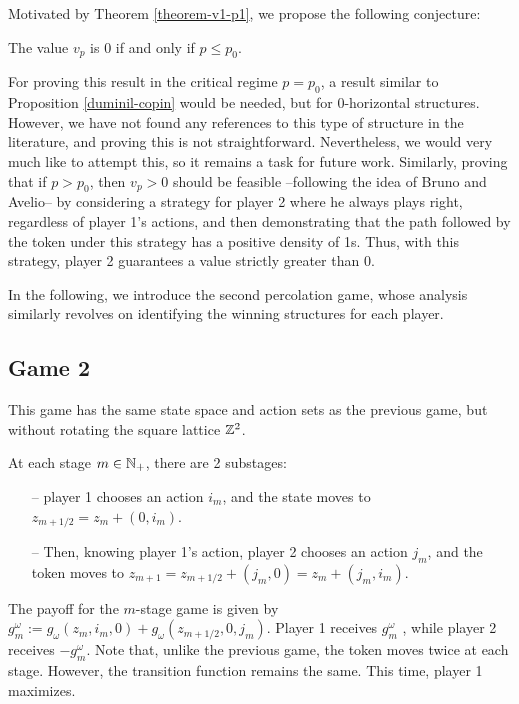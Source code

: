         Motivated by Theorem \ref{theorem-v1-p1}, we propose the following conjecture:

        \begin{conjecture}\label{conjecture-v0-p0}
            The value $v_p$ is 0 if and only if $p \leq p_0$.
        \end{conjecture}

        For proving this result in the critical regime $p = p_0$, a result similar to Proposition \ref{duminil-copin} would be needed, but for 0-horizontal structures. However, we have not found any references to this type of structure in the literature, and proving this is not straightforward. Nevertheless, we would very much like to attempt this, so it remains a task for future work. Similarly, proving that if $p > p_0$, then $v_p > 0$ should be feasible --following the idea of Bruno and Avelio-- by considering a strategy for player 2 where he always plays right, regardless of player 1's actions, and then demonstrating that the path followed by the token under this strategy has a positive density of 1s. Thus, with this strategy, player 2 guarantees a value strictly greater than 0.

        In the following, we introduce the second percolation game, whose analysis similarly revolves on identifying the winning structures for each player.

    \subsection{Game 2}     
        This game has the same state space and action sets as the previous game, but without rotating the square lattice $\mathbb{Z}^2$. 

        At each stage $m \in \mathbb{N}_+$, there are 2 substages:
        \begin{itemize}
                \item[--] player 1 chooses an action $i_m$, and the state moves to $z_{m+1/2} = z_m + (0, i_m)$.
                \item[--] Then, knowing player 1's action, player 2 chooses an action $j_m$, and the token moves to $z_{m+1} = z_{m+1/2} + (j_m, 0) = z_m + (j_m, i_m)$.
        \end{itemize}
        The payoff for the $m$-stage game is given by $g_m^{\omega} := g_{\omega}(z_{m}, i_m, 0) + g_{\omega}(z_{m+1/2}, 0, j_m)$. Player 1 receives $g_m^{\omega}$ , while player 2 receives $-g_m^{\omega}$. Note that, unlike the previous game, the token moves twice at each stage. However, the transition function remains the same. This time, player 1 maximizes.


